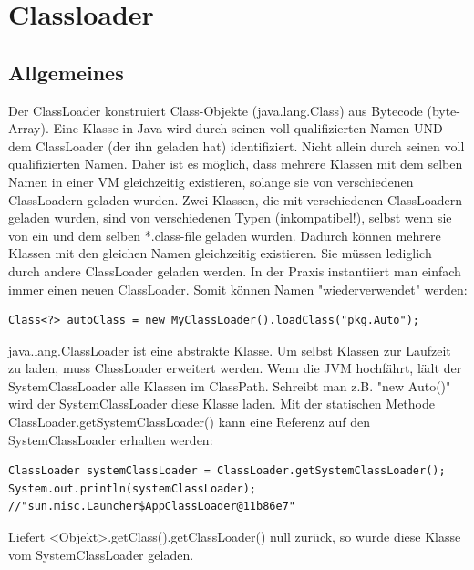 \documentclass[a4paper,14pt]{scrreprt}
\begin{document}
\section{Classloader}
\subsection{Allgemeines}
Der ClassLoader konstruiert Class-Objekte (java.lang.Class) aus Bytecode (byte-Array). Eine Klasse in Java wird durch seinen voll qualifizierten Namen UND dem ClassLoader (der ihn geladen hat) identifiziert. Nicht allein durch seinen voll qualifizierten Namen. Daher ist es möglich, dass mehrere Klassen mit dem selben Namen in einer VM gleichzeitig existieren, solange sie von verschiedenen ClassLoadern geladen wurden. Zwei Klassen, die mit verschiedenen ClassLoadern geladen wurden, sind von verschiedenen Typen (inkompatibel!), selbst wenn sie von ein und dem selben *.class-file geladen wurden. Dadurch können mehrere Klassen mit den gleichen Namen gleichzeitig existieren. Sie müssen lediglich durch andere ClassLoader geladen werden. In der Praxis instantiiert man einfach immer einen neuen ClassLoader. Somit können Namen "wiederverwendet" werden:
\begin{lstlisting}
Class<?> autoClass = new MyClassLoader().loadClass("pkg.Auto");
\end{lstlisting}
java.lang.ClassLoader ist eine abstrakte Klasse. Um selbst Klassen zur Laufzeit zu laden, muss ClassLoader erweitert werden. Wenn die JVM hochfährt, lädt der SystemClassLoader alle Klassen im ClassPath. Schreibt man z.B. "new Auto()" wird der SystemClassLoader diese Klasse laden. Mit der statischen Methode ClassLoader.getSystemClassLoader() kann eine Referenz auf den SystemClassLoader erhalten werden:
\begin{lstlisting}
ClassLoader systemClassLoader = ClassLoader.getSystemClassLoader();
System.out.println(systemClassLoader); //"sun.misc.Launcher$AppClassLoader@11b86e7"
\end{lstlisting}
Liefert <Objekt>.getClass().getClassLoader() null zurück, so wurde diese Klasse vom SystemClassLoader geladen.
\end{document}
